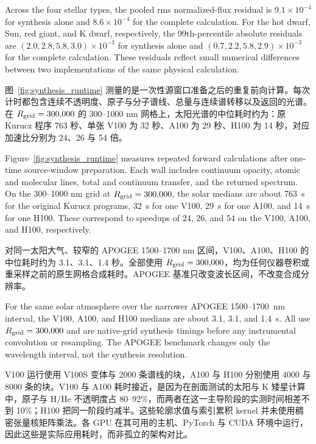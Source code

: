 \begin{EN}
Across the four stellar types, the pooled rms normalized-flux residual is
$9.1\times10^{-4}$ for synthesis alone and $8.6\times10^{-4}$ for the complete
calculation. For the hot dwarf, Sun, red giant, and K dwarf, respectively, the
99th-percentile absolute residuals are $(2.0,2.8,5.8,3.0)\times10^{-3}$ for
synthesis alone and $(0.7,2.2,5.8,2.9)\times10^{-3}$ for the complete
calculation. These residuals reflect small numerical differences between two
implementations of the same physical calculation.
\end{EN}

图~\ref{fig:synthesis_runtime} 测量的是一次性源窗口准备之后的重复前向计算。每次计时都包含连续不透明度、原子与分子谱线、总量与连续谱转移以及返回的光谱。在 $R_{\rm grid}=300{,}000$ 的 300--1000 nm 网格上，太阳光谱的中位耗时约为：原 Kurucz 程序 763 秒、单张 V100 为 32 秒、A100 为 29 秒、H100 为 14 秒，对应加速比分别为 24、26 与 54 倍。

\begin{EN}
Figure~\ref{fig:synthesis_runtime} measures repeated forward calculations after
one-time source-window preparation. Each wall includes continuum opacity,
atomic and molecular lines, total and continuum transfer, and the returned
spectrum. On the 300--1000 nm grid at $R_{\rm grid}=300{,}000$, the solar
medians are about 763~s for the original Kurucz programs, 32~s for one V100,
29~s for one A100, and 14~s for one H100. These correspond to speedups of
$24$, $26$, and $54$ on the V100, A100, and H100, respectively.
\end{EN}

对同一太阳大气、较窄的 APOGEE 1500--1700 nm 区间，V100、A100、H100 的中位耗时约为 3.1、3.1、1.4 秒。全部使用 $R_{\rm grid}=300{,}000$，均为任何仪器卷积或重采样之前的原生网格合成耗时。APOGEE 基准只改变波长区间，不改变合成分辨率。

\begin{EN}
For the same solar atmosphere over the narrower APOGEE 1500--1700~nm interval, the V100,
A100, and H100 medians are about 3.1, 3.1, and 1.4~s.
All use $R_{\rm grid}=300{,}000$ and are native-grid synthesis timings before
any instrumental convolution or resampling. The APOGEE benchmark changes only
the wavelength interval, not the synthesis resolution.
\end{EN}

V100 运行使用 V100S 变体与 2000 条谱线的块，A100 与 H100 分别使用 4000 与 8000 条的块。V100 与 A100 耗时接近，是因为在剖面测试的太阳与 K 矮星计算中，原子与 H/He 不透明度占 80--92\%，而两者在这一主导阶段的实测时间相差不到 10\%；H100 把同一阶段约减半。这些轮廓求值与索引累积 kernel 并未使用稠密张量核矩阵乘法。各 GPU 在其可用的主机、PyTorch 与 CUDA 环境中运行，因此这些是实际应用耗时，而非孤立的架构对比。

